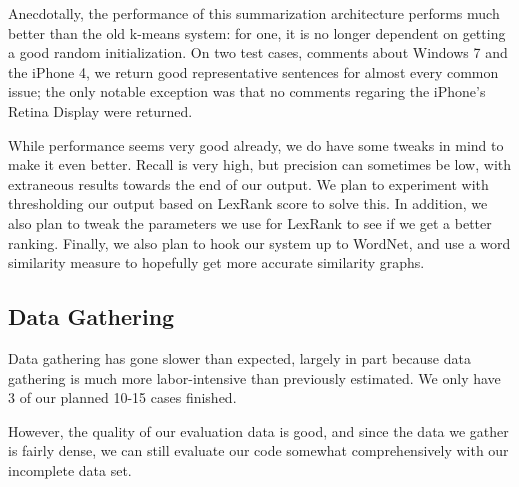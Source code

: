 \documentclass{article}
\begin{document}
Anecdotally, the performance of this summarization architecture
performs much better than the old k-means system: for one, it is no
longer dependent on getting a good random initialization. On two
test cases, comments about Windows 7 and the iPhone 4, we return
good representative sentences for almost every common issue; the
only notable exception was that no comments regaring the iPhone's
Retina Display were returned.

While performance seems very good already, we do have some tweaks
in mind to make it even better. Recall is very high, but precision
can sometimes be low, with extraneous results towards the end
of our output. We plan to experiment with thresholding our output
based on LexRank score to solve this. In addition, we also plan to
tweak the parameters we use for LexRank to see if we get a better
ranking. Finally, we also plan to hook our system up to WordNet,
and use a word similarity measure to hopefully get more accurate
similarity graphs.


\subsection{Data Gathering} %

Data gathering has gone slower than expected, largely in part
because data gathering is much more labor-intensive than previously
estimated. We only have 3 of our planned 10-15 cases finished.

However, the quality of our evaluation data is good, and since
the data we gather is fairly dense, we can still evaluate our code
somewhat comprehensively with our incomplete data set.




\tocsection


\end{document}
